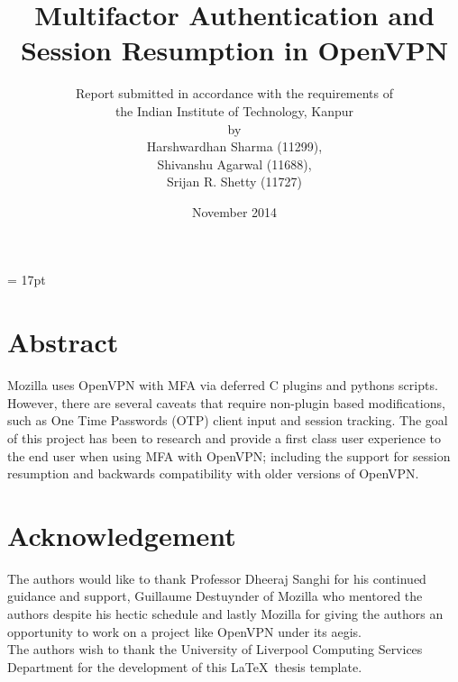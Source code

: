 \documentclass[11pt,oneside]{book}
\begin{document}
\baselineskip = 17pt

\title{Multifactor Authentication and Session Resumption in OpenVPN}
\author{Report submitted in accordance with the requirements of \\
the Indian Institute of Technology, Kanpur \\
by \\
Harshwardhan Sharma (11299),\\
Shivanshu Agarwal (11688),\\
Srijan R. Shetty (11727)}
\date{November 2014}
\maketitle
\frontmatter

\chapter{Abstract}
Mozilla uses OpenVPN with MFA via deferred C plugins and pythons scripts.
However, there are several caveats that require non-plugin based modifications,
such as One Time Passwords (OTP) client input and session tracking.
The goal of this project has been to research and provide a first class user experience
to the end user when using MFA with OpenVPN; including the support for session resumption
and backwards compatibility with older versions of OpenVPN.

\tableofcontents
{}

\listoffigures
{}

\chapter{Acknowledgement}
The authors would like to thank Professor Dheeraj Sanghi for his continued guidance
and support, Guillaume Destuynder of Mozilla who mentored the authors despite his
hectic schedule and lastly Mozilla for giving the authors an opportunity to work on
a project like OpenVPN under its aegis.\\
The authors wish to thank the University of Liverpool Computing Services Department
for the development of this \LaTeX \ thesis template.

\printglossary
{}
\end{document}
